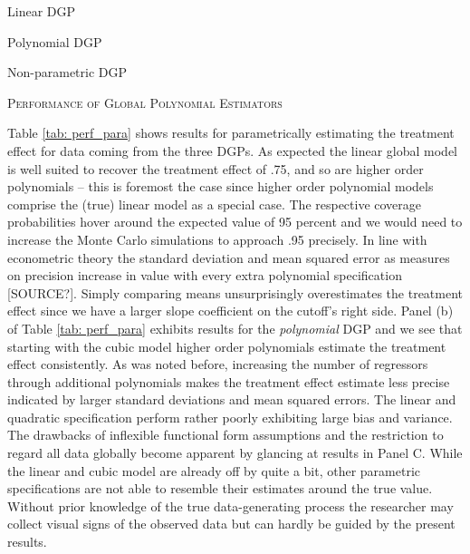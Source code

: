 \begin{table}[H]
	\begin{subtable}{\textwidth}
		\centering
		
		\caption{Linear DGP}
		\label{tab: global_poly_linear}
		\hspace{\fill}
	\end{subtable}
	\begin{subtable}{\textwidth}
		\centering
		
		\caption{Polynomial DGP}
		\label{tab: global_poly_poly}
		\hspace{\fill}
	\end{subtable}
	\begin{subtable}{\textwidth}
		\centering
		
		\caption{Non-parametric DGP}
		\label{tab: global_poly_nonparam}
	\end{subtable}
	\caption{\textsc{Performance of Global Polynomial Estimators}}
	\label{tab: perf_para}
\end{table}

Table \ref{tab: perf_para} shows results for parametrically estimating the treatment effect for data coming from the three DGPs. As expected the linear global model is well suited to recover the treatment effect of .75, and so are higher order polynomials -- this is foremost the case since higher order polynomial models comprise the (true) linear model as a special case. The respective coverage probabilities hover around the expected value of 95 percent and we would need to increase the Monte Carlo simulations to approach .95 precisely. In line with econometric theory the standard deviation and mean squared error as measures on precision increase in value with every extra polynomial specification [SOURCE?]. Simply comparing means unsurprisingly overestimates the treatment effect since we have a larger slope coefficient on the cutoff's right side. Panel (b) of Table \ref{tab: perf_para} exhibits results for the \textit{polynomial} DGP and we see that starting with the cubic model higher order polynomials estimate the treatment effect consistently. As was noted before, increasing the number of regressors through additional polynomials makes the treatment effect estimate less precise indicated by larger standard deviations and mean squared errors. The linear and quadratic specification perform rather poorly exhibiting large bias and variance. The drawbacks of inflexible functional form assumptions and the restriction to regard all data globally become apparent by glancing at results in Panel C. While the linear and cubic model are already off by quite a bit, other parametric specifications are not able to resemble their estimates around the true value. Without prior knowledge of the true data-generating process the researcher may collect visual signs of the observed data but can hardly be guided by the present results.

